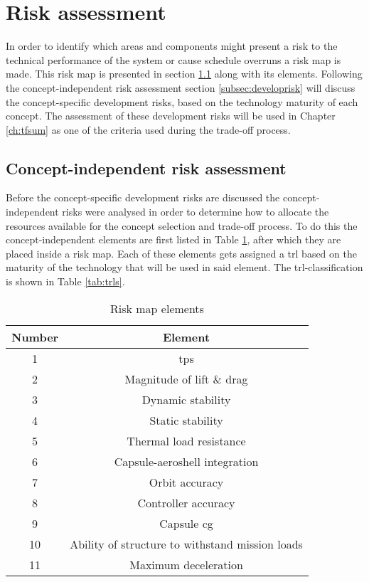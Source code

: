 \section{Risk assessment}
\label{ch:riskestimation}
In order to identify which areas and components might present a risk to the technical performance of the system or cause schedule overruns a risk map is made. This risk map is presented in section \ref{subsec:riskmap} along with its elements. Following the concept-independent risk assessment section \ref{subsec:developrisk} will discuss the concept-specific development risks, based on the technology maturity of each concept. The assessment of these development risks will be used in Chapter \ref{ch:tfsum} as one of the criteria used during the trade-off process.

\subsection{Concept-independent risk assessment} \label{subsec:riskmap}
Before the concept-specific development risks are discussed the concept-independent risks were analysed in order to determine how to allocate the resources available for the concept selection and trade-off process. To do this the concept-independent elements are first listed in Table \ref{tab:riskmapelements}, after which they are placed inside a risk map. Each of these elements gets assigned a \acrfull{trl} \cite{NASA2007} based on the maturity of the technology that will be used in said element. The \gls{trl}-classification is shown in Table \ref{tab:trls}.
\begin{table}[h]
	\centering
	\caption{Risk map elements}
	\label{tab:riskmapelements}
	\begin{tabular}{|c|c|}
		\hline 
		\textbf{Number} & \textbf{Element} \\ \hline \hline
		1 & \acrlong{tps} \\
		2 & Magnitude of lift \& drag\\
		3 & Dynamic stability\\
		4 & Static stability\\
		5 & Thermal load resistance\\
		6 & Capsule-aeroshell integration\\
		7 & Orbit accuracy\\
		8 & Controller accuracy\\
		9 & Capsule \acrlong{cg}\\
		10 & Ability of structure to withstand mission loads\\
		11 & Maximum deceleration\\
		\hline
	\end{tabular}
\end{table}

